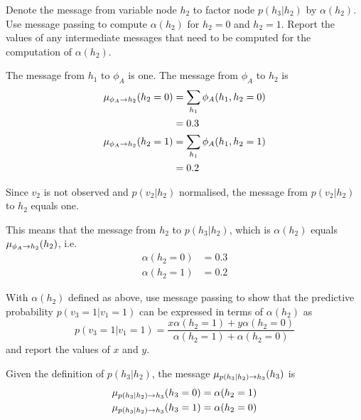 \begin{exenumerate}
\begin{solution}
  \end{solution}

\item  Denote the message from variable node $h_2$ to factor node $p(h_3 |
  h_2)$ by $\alpha(h_2)$. Use message passing to compute $\alpha(h_2)$
  for $h_2=0$ and $h_2=1$. Report the values of any intermediate
  messages that need to be computed for the computation of
  $\alpha(h_2)$.

  \begin{solution}
    
    The message from $h_1$ to $\phi_A$ is one. The message from
    $\phi_A$ to $h_2$ is 
    \begin{align}
      \fxmess{\phi_A}{h_2}{1}(h_2=0) & = \sum_{h_1} \phi_A(h_1, h_2=0)\\
      & = 0.3\\
      \fxmess{\phi_A}{h_2}{1}(h_2=1) & = \sum_{h_1} \phi_A(h_1, h_2=1)\\
      & = 0.2
    \end{align}
    
    Since $v_2$ is not observed and $p(v_2|h_2)$ normalised, the message from $p(v_2|h_2)$ to $h_2$ equals one.

    This means that the message from $h_2$ to $p(h_3 | h_2)$, which is
    $\alpha(h_2)$ equals $\fxmess{\phi_A}{h_2}{1}(h_2)$, i.e.\ 
    \begin{align}
      \alpha(h_2=0) & = 0.3\\
      \alpha(h_2=1) & = 0.2
    \end{align}

  \end{solution}
  
\item With $\alpha(h_2)$ defined as above, use message passing to show
  that the predictive probability $p(v_3=1 | v_1=1)$ can be expressed in terms of $\alpha(h_2)$
  as
  \begin{equation}
    p(v_3=1 | v_1=1) = \frac{ x \alpha(h_2=1) + y \alpha(h_2=0)}{\alpha(h_2=1)+\alpha(h_2=0)}
  \end{equation}
  and report the values of $x$ and $y$.  

  \begin{solution}

    
    Given the definition of $p(h_3| h_2)$, the message $\fxmess{p(h_3|h_2)}{h_3}{1}(h_3)$ is
    \begin{align}
      \fxmess{p(h_3|h_2)}{h_3}{1}(h_3=0) & = \alpha(h_2 =1)\\
      \fxmess{p(h_3|h_2)}{h_3}{1}(h_3=1) & = \alpha(h_2 =0)
  \end{align}
    

\end{solution}
\end{exenumerate}
